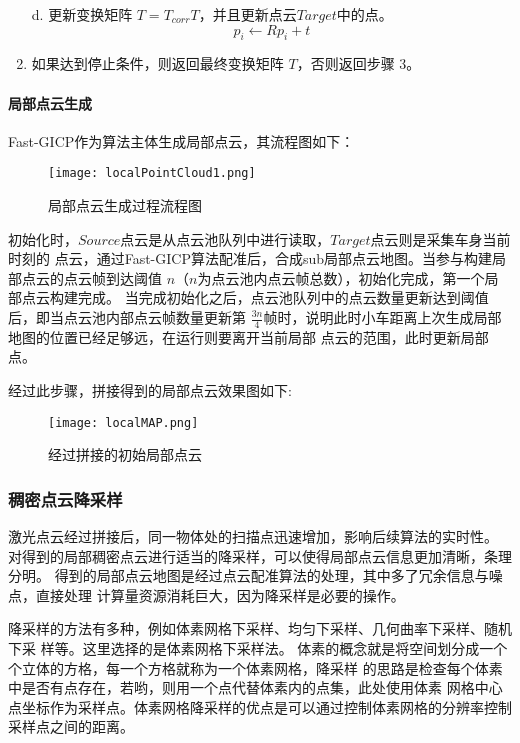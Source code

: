 \begin{enumerate}
d. 更新变换矩阵 $T=T_{corr}T$，并且更新点云$Target$中的点。
\begin{equation}
    p_i \leftarrow Rp_i + t
\end{equation}

    \item 如果达到停止条件，则返回最终变换矩阵 $T$，否则返回步骤 3。

\end{enumerate}

\paragraph{局部点云生成}
Fast-GICP作为算法主体生成局部点云，其流程图如下：
\begin{figure}[ht]
    \centering
    \texttt{[image: localPointCloud1.png]}
    \caption{局部点云生成过程流程图}
\end{figure}
初始化时，$Source$点云是从点云池队列中进行读取，$Target$点云则是采集车身当前时刻的
点云，通过Fast-GICP算法配准后，合成sub局部点云地图。当参与构建局部点云的点云帧到达阈值
$n$（$n$为点云池内点云帧总数），初始化完成，第一个局部点云构建完成。
当完成初始化之后，点云池队列中的点云数量更新达到阈值后，即当点云池内部点云帧数量更新第
$\frac{3n}{4}$帧时，说明此时小车距离上次生成局部地图的位置已经足够远，在运行则要离开当前局部
点云的范围，此时更新局部点。

经过此步骤，拼接得到的局部点云效果图如下:
\begin{figure}[ht]
    \centering
    \texttt{[image: localMAP.png]}
    \caption{经过拼接的初始局部点云}
\end{figure}



\subsubsection{稠密点云降采样}
激光点云经过拼接后，同一物体处的扫描点迅速增加，影响后续算法的实时性。
对得到的局部稠密点云进行适当的降采样，可以使得局部点云信息更加清晰，条理分明。
得到的局部点云地图是经过点云配准算法的处理，其中多了冗余信息与噪点，直接处理
计算量资源消耗巨大，因为降采样是必要的操作。

降采样的方法有多种，例如体素网格下采样、均匀下采样、几何曲率下采样、随机下采
样等。这里选择的是体素网格下采样法。
体素的概念就是将空间划分成一个个立体的方格，每一个方格就称为一个体素网格，降采样
的思路是检查每个体素中是否有点存在，若哟，则用一个点代替体素内的点集，此处使用体素
网格中心点坐标作为采样点。体素网格降采样的优点是可以通过控制体素网格的分辨率控制
采样点之间的距离。

